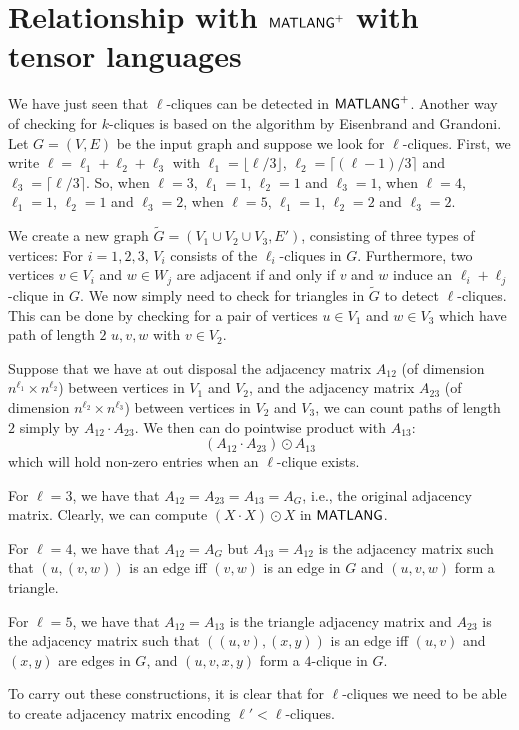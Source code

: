 \section{Relationship with $\mathsf{MATLANG}^{\sf +}$ with tensor languages}
We have just seen that $\ell$-cliques can be detected in $\mathsf{MATLANG}^{\sf +}$. Another way of checking for $k$-cliques is based on the algorithm by Eisenbrand and Grandoni.
Let $G=(V,E)$ be the input graph and suppose we look for $\ell$-cliques. First, we write $\ell=\ell_1+\ell_2+\ell_3$ with $\ell_1=\lfloor\ell/3\rfloor$, $\ell_2=\lceil (\ell-1)/3\rceil$ and
$\ell_3=\lceil \ell/3\rceil$. So, when $\ell=3$, $\ell_1=1$, $\ell_2=1$ and $\ell_3=1$,
when $\ell=4$, $\ell_1=1$, $\ell_2=1$ and $\ell_3=2$, when $\ell=5$, $\ell_1=1$, $\ell_2=2$ and $\ell_3=2$.

We create a new graph $\tilde{G}=(V_1\cup V_2\cup V_3,E')$, consisting of three types of vertices: For $i=1,2,3$, $V_i$ consists of the $\ell_i$-cliques in $G$. Furthermore, two vertices $v\in V_i$ and $w\in W_j$
are adjacent if and only if $v$ and $w$ induce an $\ell_i+\ell_j$-clique in $G$. We now simply need to check for triangles in $\tilde{G}$ to detect $\ell$-cliques. This can be done by
checking for a pair of vertices $u\in V_1$ and $w\in V_3$ which have path of length $2$ $u,v,w$ with $v\in V_2$.

Suppose that we have at out disposal the adjacency matrix $A_{12}$ (of dimension $n^{\ell_1}\times n^{\ell_2}$) between vertices in $V_1$ and $V_2$,
and  the adjacency matrix $A_{23}$ (of dimension $n^{\ell_2}\times n^{\ell_3}$) between vertices in $V_2$ and $V_3$, we can count paths of length $2$
simply by $A_{12}\cdot A_{23}$. We then can do pointwise product with $A_{13}$:
$$(A_{12}\cdot A_{23})\odot A_{13}
$$
which will hold non-zero entries when an $\ell$-clique exists.

For $\ell=3$, we have that $A_{12}=A_{23}=A_{13}=A_G$, i.e., the original adjacency matrix. Clearly, we can compute $(X\cdot X)\odot X$ in $\mathsf{MATLANG}$.

For $\ell=4$, we have that $A_{12}=A_G$ but $A_{13}=A_{12}$ is the adjacency matrix such that $(u,(v,w))$ is an edge iff $(v,w)$ is an edge in $G$ and
$(u,v,w)$ form a triangle.

For $\ell=5$, we have that $A_{12}=A_{13}$ is the triangle adjacency matrix and $A_{23}$ is the adjacency matrix such that $((u,v),(x,y))$ is an edge
iff $(u,v)$ and $(x,y)$ are edges in $G$, and $(u,v,x,y)$ form a $4$-clique in $G$.

To carry out these constructions, it is clear that for $\ell$-cliques we need to be able to create adjacency matrix encoding $\ell'<\ell$-cliques. 

